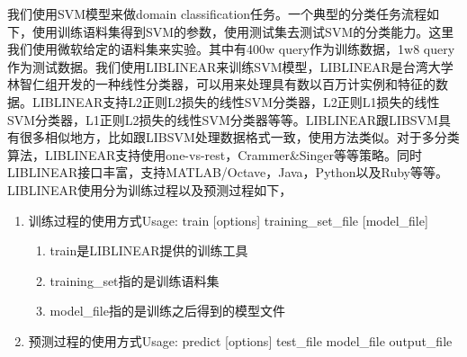\documentclass[master]{njuthesis}
\begin{document}
    我们使用SVM模型来做domain classification任务。一个典型的分类任务流程如下，使用训练语料集得到SVM的参数，使用测试集去测试SVM的分类能力。这里我们使用微软给定的语料集来实验。其中有400w query作为训练数据，1w8 query作为测试数据。我们使用LIBLINEAR来训练SVM模型，LIBLINEAR是台湾大学林智仁组开发的一种线性分类器，可以用来处理具有数以百万计实例和特征的数据。LIBLINEAR支持L2正则L2损失的线性SVM分类器，L2正则L1损失的线性SVM分类器，L1正则L2损失的线性SVM分类器等等。LIBLINEAR跟LIBSVM具有很多相似地方，比如跟LIBSVM处理数据格式一致，使用方法类似。对于多分类算法，LIBLINEAR支持使用one-vs-rest，Crammer\&Singer等等策略。同时LIBLINEAR接口丰富，支持MATLAB/Octave，Java，Python以及Ruby等等。LIBLINEAR使用分为训练过程以及预测过程如下，
\begin{enumerate}
    \item 训练过程的使用方式Usage: train [options] training\_set\_file [model\_file]
     \begin{enumerate}
       \item train是LIBLINEAR提供的训练工具
       \item training\_set指的是训练语料集
       \item model\_file指的是训练之后得到的模型文件
     \end{enumerate}
    \item 预测过程的使用方式Usage: predict [options] test\_file model\_file output\_file
    

\end{enumerate}
\end{document}
